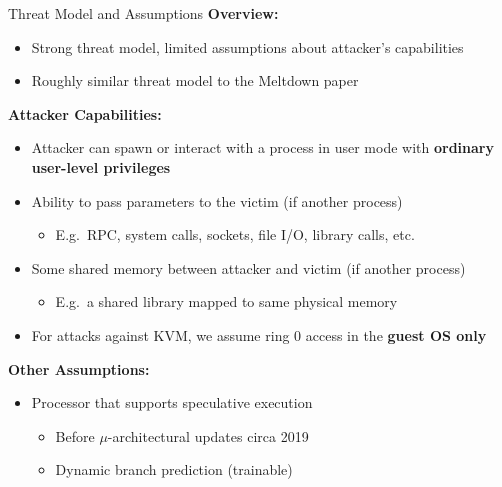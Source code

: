 \documentclass[10pt, dvipsnames, aspectratio=169]{beamer}
\begin{document}
\begin{frame}[c]{Threat Model and Assumptions}{}
  {\bf Overview:}
  \begin{itemize}
    \item Strong threat model, limited assumptions about attacker's capabilities
    \item Roughly similar threat model to the Meltdown paper
  \end{itemize}

  \vfill
  {\bf Attacker Capabilities:}
  \begin{itemize}
    \item Attacker can spawn or interact with a process in user mode with {\bf ordinary user-level privileges}
    \item Ability to pass parameters to the victim (if another process)
    \begin{itemize}
      \item E.g.~RPC, system calls, sockets, file I/O, library calls, etc.
    \end{itemize}
    \item Some shared memory between attacker and victim (if another process)
    \begin{itemize}
      \item E.g.~a shared library mapped to same physical memory
    \end{itemize}
    \item For attacks against KVM, we assume ring 0 access in the {\bf guest OS only}
  \end{itemize}

  \vfill
  {\bf Other Assumptions:}
  \begin{itemize}
    \item Processor that supports speculative execution
    \begin{itemize}
      \item Before $\mu$-architectural updates circa 2019
      \item Dynamic branch prediction (trainable)
    \end{itemize}
  \end{itemize}
\end{frame}

\end{document}
